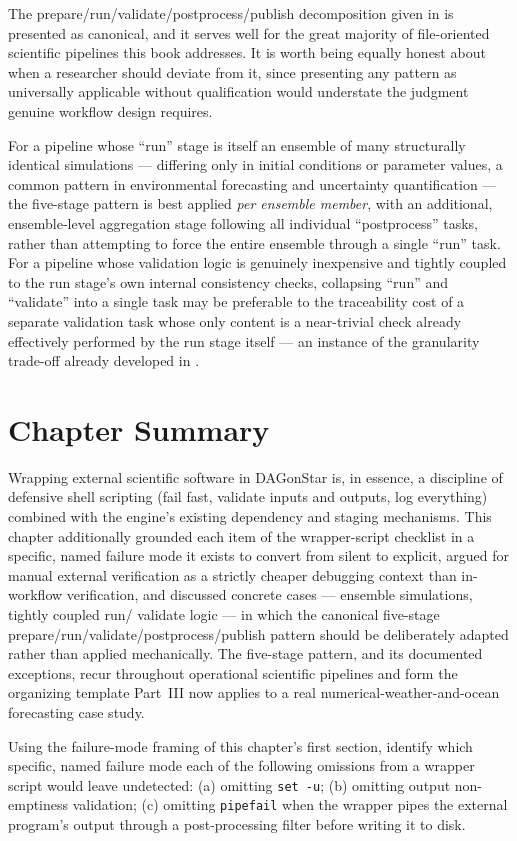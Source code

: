 The prepare/run/validate/postprocess/publish decomposition given in
 is presented as canonical, and it serves well
for the great majority of file-oriented scientific pipelines this book
addresses. It is worth being equally honest about when a researcher should
deviate from it, since presenting any pattern as universally applicable
without qualification would understate the judgment genuine workflow design
requires.

For a pipeline whose ``run'' stage is itself an ensemble of many
structurally identical simulations --- differing only in initial conditions
or parameter values, a common pattern in environmental forecasting and
uncertainty quantification --- the five-stage pattern is best applied
\emph{per ensemble member}, with an additional, ensemble-level aggregation
stage following all individual ``postprocess'' tasks, rather than attempting
to force the entire ensemble through a single ``run'' task. For a pipeline
whose validation logic is genuinely inexpensive and tightly coupled to the
run stage's own internal consistency checks, collapsing ``run'' and
``validate'' into a single task may be preferable to the traceability cost
of a separate validation task whose only content is a near-trivial check
already effectively performed by the run stage itself --- an instance of the
granularity trade-off already developed in .

\section{Chapter Summary}

Wrapping external scientific software in DAGonStar is, in essence, a
discipline of defensive shell scripting (fail fast, validate inputs and
outputs, log everything) combined with the engine's existing dependency and
staging mechanisms. This chapter additionally grounded each item of the
wrapper-script checklist in a specific, named failure mode it exists to
convert from silent to explicit, argued for manual external verification as
a strictly cheaper debugging context than in-workflow verification, and
discussed concrete cases --- ensemble simulations, tightly coupled run/
validate logic --- in which the canonical five-stage
prepare/run/validate/postprocess/publish pattern should be deliberately
adapted rather than applied mechanically. The five-stage pattern, and its
documented exceptions, recur throughout operational scientific pipelines and
form the organizing template Part~III now applies to a real
numerical-weather-and-ocean forecasting case study.

\begin{exercise}
Using the failure-mode framing of this chapter's first section, identify
which specific, named failure mode each of the following omissions from a
wrapper script would leave undetected: (a) omitting \texttt{set -u}; (b)
omitting output non-emptiness validation; (c) omitting \texttt{pipefail}
when the wrapper pipes the external program's output through a
post-processing filter before writing it to disk.
\end{exercise}
